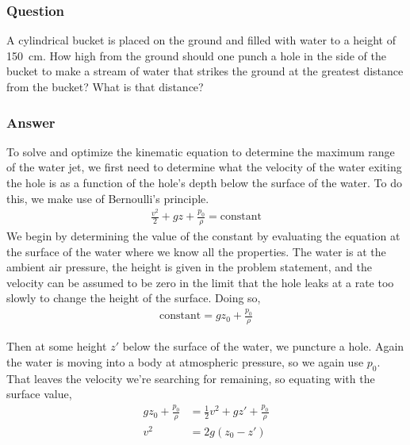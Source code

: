 \subsubsection{Question}

A cylindrical bucket is placed on the ground and filled with water to a
height of \SI{150}{\cm}. How high from the ground should one punch a hole in
the side of the bucket to make a stream of water that strikes the ground at
the greatest distance from the bucket? What is that distance?

\subsubsection{Answer}

To solve and optimize the kinematic equation to determine the maximum range
of the water jet, we first need to determine what the velocity of the water
exiting the hole is as a function of the hole's depth below the surface of the
water. To do this, we make use of Bernoulli's principle.
\begin{align*}
    \frac{v^2}{2} + gz + \frac{p_0}{\rho } = \text{constant}
\end{align*}
We begin by determining the value of the constant by evaluating the equation
at the surface of the water where we know all the properties. The water is
at the ambient air pressure, the height is given in the problem statement,
and the velocity can be assumed to be zero in the limit that the hole leaks
at a rate too slowly to change the height of the surface. Doing so,
\begin{align*}
    \text{constant} = gz_0 + \frac{p_0}{\rho }
\end{align*}

Then at some height $z'$ below the surface of the water, we puncture a hole.
Again the water is moving into a body at atmospheric pressure, so we again
use $p_0$. That leaves the velocity we're searching for remaining, so equating
with the surface value,
\begin{align*}
    gz_0 + \frac{p_0}{\rho } &= \frac 12 v^2 + gz' + \frac{p_0}{\rho } \\
    v^2 &= 2g(z_0 - z')
\end{align*}

